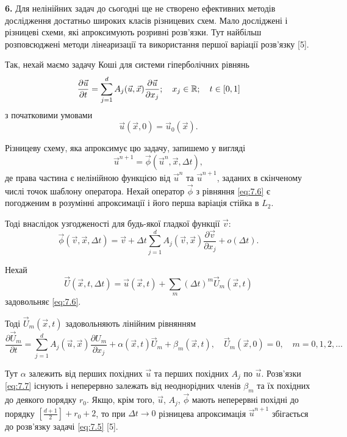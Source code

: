 \textbf{6.} Для нелінійних задач до сьогодні ще не створено ефективних методів дослідження достатньо широких класів різницевих схем. Мало досліджені і різницеві схеми, які апроксимують розривні розв'язки. Тут найбільш розповсюджені методи лінеаризації та використання першої варіації розв'язку [5].  \medskip

Так, нехай маємо задачу Коші для системи гіперболічних рівнянь 
\begin{equation}
    \label{eq:7.5}
    \frac{\partial \vec u}{\partial t} = \sum_{j = 1}^d A_j(\vec u, \vec x) \frac{\partial \vec u}{\partial x_j}; \quad x_j \in \RR; \quad t \in [0, 1]
\end{equation}
з початковими умовами 
\begin{equation*}
    \vec u(\vec x, 0) = \vec u_0(\vec x).
\end{equation*}

Різницеву схему, яка апроксимує цю задачу, запишемо у вигляді
\begin{equation}
    \label{eq:7.6}
    \vec u^{n + 1} = \vec \phi(\vec u^n, \vec x, \Delta t),
\end{equation}
де права частина є нелінійною функцією від $\vec u^n$ та $\vec u^{n + 1}$, заданих в скінченому числі точок шаблону оператора. Нехай оператор $\vec \phi$ з рівняння \eqref{eq:7.6} є погодженим в розумінні апроксимації і його перша варіація стійка в $L_2$. \medskip

Тоді внаслідок узгодженості для будь-якої гладкої функції $\vec v$:
\begin{equation*}
    \vec \phi(\vec v, \vec x, \Delta t) = \vec v + \Delta t \sum_{j = 1}^d A_j(\vec v, \vec x) \frac{\partial \vec v}{\partial x_j} + o(\Delta t).
\end{equation*}

Нехай
\begin{equation*}
    \vec U(\vec x, t, \Delta t) = \vec u(\vec x, t) + \sum_m (\Delta t)^m \vec U_m (\vec x, t)
\end{equation*}
задовольняє \eqref{eq:7.6}. \medskip

Тоді $\vec U_m(\vec x, t)$  задовольняють лінійним рівнянням
\begin{equation}
    \label{eq:7.7}
    \frac{\partial \vec U_m}{\partial t} = \sum_{j = 1}^d A_j(\vec u, \vec x) \frac{\partial U_m}{\partial x_j} + \alpha(\vec x, t) \vec U_m + \beta_m(\vec x, t), \quad \vec U_m(\vec x, 0) = 0, \quad m = 0, 1, 2, \dots
\end{equation}

Тут $\alpha$ залежить від перших похідних $\vec u$ та перших похідних $A_j$ по $\vec u$. Розв'язки \eqref{eq:7.7} існують і неперервно залежать від неоднорідних членів $\beta_m$ та їх похідних до деякого порядку $r_0$. Якщо, крім того, $\vec u$, $A_j$, $\vec \phi$ мають неперервні похідні до порядку $[\frac{d + 1}{2}] + r_0 + 2$, то при $\Delta t \to 0$ різницева апроксимація $\vec u^{n + 1}$ збігається до розв'язку задачі \eqref{eq:7.5} [5]. \medskip

